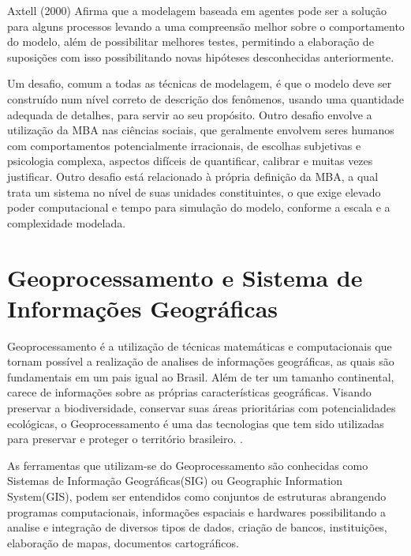 
Axtell (2000) Afirma que a modelagem baseada em agentes pode ser a solução para alguns processos levando a uma compreensão melhor sobre o comportamento do modelo, além de possibilitar melhores testes, permitindo a elaboração de suposições com isso possibilitando novas hipóteses desconhecidas anteriormente.\cite{Axtell:online}

Um desafio, comum a todas as técnicas de modelagem, é que o modelo deve ser construído num nível correto de descrição dos fenômenos, usando uma quantidade adequada de detalhes, para servir ao seu propósito. Outro desafio envolve a utilização da MBA nas ciências sociais, que geralmente envolvem seres humanos com comportamentos potencialmente irracionais, de escolhas subjetivas e psicologia complexa, aspectos difíceis de quantificar, calibrar e muitas vezes justificar. Outro desafio está relacionado à própria definição da MBA, a qual trata um sistema no nível de suas unidades constituintes, o que exige elevado poder computacional e tempo para simulação do modelo, conforme a escala e a complexidade modelada.

\section{Geoprocessamento e Sistema de Informações Geográficas}

Geoprocessamento é a utilização de técnicas matemáticas e computacionais que tornam possível a realização de analises de informações geográficas, as quais são fundamentais em um pais igual ao Brasil. Além de ter um tamanho continental, carece de informações sobre as próprias características geográficas. Visando preservar a biodiversidade, conservar suas áreas prioritárias com potencialidades ecológicas, o Geoprocessamento é uma das tecnologias que tem sido utilizadas para preservar e proteger o território brasileiro.\cite{ximenes_modelagem_2008} \cite{georef:online}. 

As ferramentas que utilizam-se do Geoprocessamento são conhecidas como Sistemas de Informação Geográficas(SIG) ou Geographic Information System(GIS), podem ser entendidos como conjuntos de estruturas abrangendo programas computacionais, informações espaciais e hardwares possibilitando a analise e integração de diversos tipos de dados, criação de bancos, instituições, elaboração de mapas, documentos cartográficos\cite{Burrough:online}.

